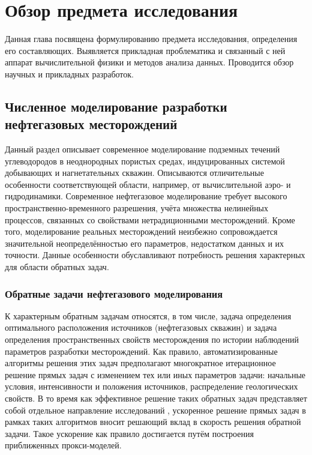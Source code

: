 \chapter{Обзор предмета исследования}\label{ch:ch1}

Данная глава посвящена формулированию предмета исследования, определения его составляющих.
Выявляется прикладная проблематика и связанный с ней аппарат вычислительной физики и методов анализа данных. Проводится обзор научных и прикладных разработок.

\section{Численное моделирование разработки нефтегазовых месторождений}

Данный раздел описывает современное моделирование подземных течений углеводородов в неоднородных пористых средах, индуцированных системой добывающих и нагнетательных скважин.
Описываются отличительные особенности соответствующей области, например, от вычислительной аэро- и гидродинамики.
Современное нефтегазовое моделирование требует высокого пространственно-временного разрешения, учёта множества нелинейных процессов, связанных со свойствами нетрадиционными месторождений.
Кроме того, моделирование реальных месторождений неизбежно сопровождается значительной неопределённостью его параметров, недостатком данных и их точности.
Данные особенности обуславливают потребность решения характерных для области обратных задач.

\subsection{Обратные задачи нефтегазового моделирования}
К характерным обратным задачам относятся, в том числе, задача определения оптимального расположения источников (нефтегазовых скважин) и задача определения пространственных свойств месторождения по истории наблюдений параметров разработки месторождений.
Как правило, автоматизированные алгоритмы решения этих задач предполагают многократное итерационное решение прямых задач с изменением тех или иных параметров задачи: начальные условия, интенсивности и положения источников, распределение геологических свойств. В то время как эффективное решение таких обратных задач представляет собой отдельное направление исследований , ускоренное решение прямых задач в рамках таких алгоритмов вносит решающий вклад в скорость решения обратной задачи. Такое ускорение как правило достигается путём построения приближенных прокси-моделей.

